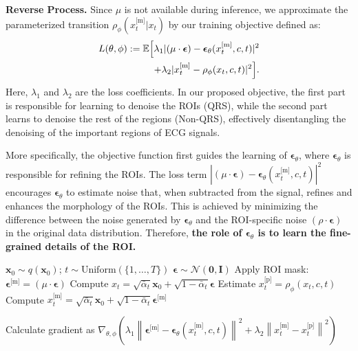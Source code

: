 \documentclass[letterpaper]{article} %
\newcommand{\grad}{\nabla}
\newcommand{\bI}{\mathbf{I}}
\newcommand{\bzero}{\mathbf{0}}
\newcommand{\bx}{\mathbf{x}}
\newcommand{\bepsilon}{{\boldsymbol{\epsilon}}}
\newcommand{\x}{{\boldsymbol x}}
\begin{document}
\noindent\textbf{Reverse Process.} Since $\mu$ is not available during inference, we approximate the parameterized transition $\rho_{\phi}(x_t^{\text{[m]}} | x_t)$ by our training objective defined as:
\begin{equation}
\begin{aligned}
\label{eq:rddm-objective}
 L(\theta, \phi):=\mathbb{E}\Big{[} \lambda_{1} | (\mu \cdot \boldsymbol{\epsilon})-\boldsymbol{\epsilon}_\theta(x_t^{\text{[m]}}, c,  t)|^2 \\ + \lambda_{2} |x_t^{\text{[m]}} - \rho_{\phi}(x_t, c, t)|^2\Big{]}.
\end{aligned}
\end{equation}
Here, $\lambda_{1}$ and $\lambda_{2}$ are the loss coefficients. In our proposed objective, the first part is responsible for learning to denoise the ROIs (QRS), while the second part learns to denoise the rest of the regions (Non-QRS), effectively disentangling the denoising of the important regions of ECG signals.

More specifically, the objective function first guides the learning of $\boldsymbol{\epsilon}_\theta$, where $\boldsymbol{\epsilon}_\theta$ is responsible for refining the ROIs. The loss term $|(\mu \cdot \boldsymbol{\epsilon})-\boldsymbol{\epsilon}_\theta(x_t^{\text{[m]}}, c, t)|^2$ encourages $\boldsymbol{\epsilon}_\theta$ to estimate noise that, when subtracted from the signal, refines and enhances the morphology of the ROIs. This is achieved by minimizing the difference between the noise generated by $\boldsymbol{\epsilon}_\theta$ and the ROI-specific noise $(\rho \cdot \boldsymbol{\epsilon})$ in the original data distribution. Therefore, \textbf{the role of $\boldsymbol{\epsilon}_\theta$ is to learn the fine-grained details of the ROI.}

\algrenewcommand\algorithmicindent{0.5em}
\begin{algorithm}[t]
  \caption{RDDM Training} \label{alg:training}
  \small
  \begin{algorithmic}[1]
    \Repeat
      \State $\bx_0 \sim q(\bx_0)$;
      \State $t \sim \mathrm{Uniform}(\{1, \dotsc, T\})$
      \State $\bepsilon\sim\mathcal{N}(\bzero,\bI)$
      \State Apply ROI mask: $\bepsilon^{\text{[m]}} = (\mu \cdot \bepsilon)$
      \State Compute $x_t = \sqrt{\bar\alpha_t} \x_0 + \sqrt{1-\bar\alpha_t}\bepsilon$
      \State Estimate $x_t^{\text{[p]}} = \rho_{\phi}(x_t, c, t)$
      \State Compute $x_t^{\text{[m]}} = \sqrt{\bar\alpha_t} \x_0 + \sqrt{1-\bar\alpha_t}\bepsilon^{\text{[m]}}$

      \State Calculate gradient as
      \Statex $\grad_{\theta, \phi}\!\left( \lambda_{1} \left\| \bepsilon^{\text{[m]}}\!-\!\bepsilon_\theta(x_t^{\text{[m]}}, c, t) \right\|^2\! +\! \lambda_{2}  \left\| x_t^{\text{[m]}}\! -\! x_t^{\text{[p]}} \right\|^2 \right)$
  \end{algorithmic}
\end{algorithm}
\end{document}
